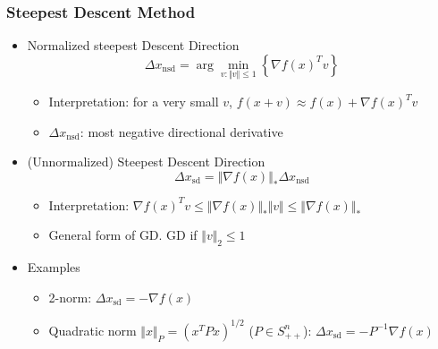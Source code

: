 \subsubsection*{Steepest Descent Method}
\begin{itemize}
    \item Normalized steepest Descent Direction
        $$ \Delta x_\mathrm{nsd}=\arg\min_{v:\Vert v\Vert\leq 1} \left\{\nabla f(x)^T v\right\} $$
    \begin{itemize}
        \item Interpretation: for a very small $v$, $f(x+v)\approx f(x)+\nabla f(x)^T v$
        \item $\Delta x_{\mathrm{nsd}}$: most negative directional derivative
    \end{itemize}
    \item (Unnormalized) Steepest Descent Direction
        $$ \Delta x_\mathrm{sd}=\Vert\nabla f(x)\Vert_\ast\Delta x_\mathrm{nsd} $$
    \begin{itemize}
        \item Interpretation: $\nabla f(x)^Tv\leq\Vert\nabla f(x)\Vert_\ast\Vert v\Vert\leq\Vert\nabla f(x)\Vert_\ast$
        \item General form of GD. GD if $\Vert v\Vert_2\leq 1$
    \end{itemize}
    \item Examples
    \begin{itemize}
        \item 2-norm: $\Delta x_\mathrm{sd} = -\nabla f(x)$
        \item Quadratic norm $\Vert x\Vert_P=(x^TPx)^{1/2}$ ($P\in S_{++}^n$): $\Delta x_\mathrm{sd}=-P^{-1}\nabla f(x)$
    \end{itemize}
\end{itemize}

